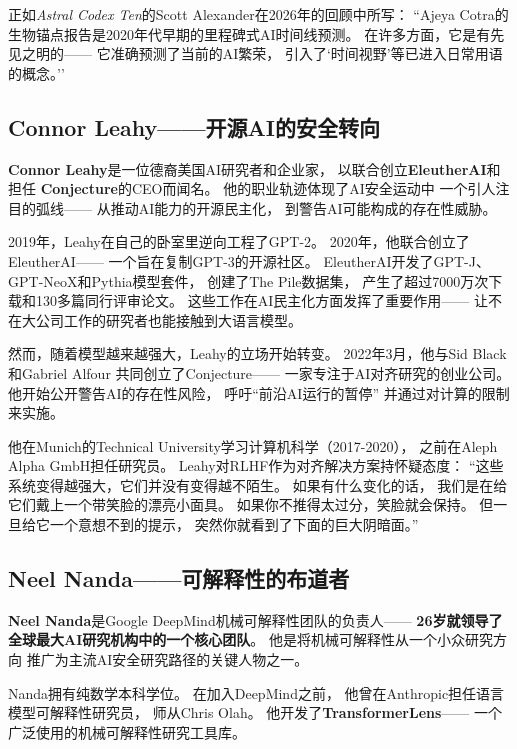 正如\textit{Astral Codex Ten}的Scott Alexander在2026年的回顾中所写：
``Ajeya Cotra的生物锚点报告是2020年代早期的里程碑式AI时间线预测。
在许多方面，它是有先见之明的——
它准确预测了当前的AI繁荣，
引入了`时间视野'等已进入日常用语的概念。''

\subsection{Connor Leahy——开源AI的安全转向}
\label{subsec:leahy}

\textbf{Connor Leahy}是一位德裔美国AI研究者和企业家，
以联合创立\textbf{EleutherAI}和担任
\textbf{Conjecture}的CEO而闻名。
他的职业轨迹体现了AI安全运动中
一个引人注目的弧线——
从推动AI能力的开源民主化，
到警告AI可能构成的存在性威胁。

2019年，Leahy在自己的卧室里逆向工程了GPT-2。
2020年，他联合创立了EleutherAI——
一个旨在复制GPT-3的开源社区。
EleutherAI开发了GPT-J、GPT-NeoX和Pythia模型套件，
创建了The Pile数据集，
产生了超过7000万次下载和130多篇同行评审论文。
这些工作在AI民主化方面发挥了重要作用——
让不在大公司工作的研究者也能接触到大语言模型。

然而，随着模型越来越强大，Leahy的立场开始转变。
2022年3月，他与Sid Black和Gabriel Alfour
共同创立了Conjecture——
一家专注于AI对齐研究的创业公司。
他开始公开警告AI的存在性风险，
呼吁``前沿AI运行的暂停''
并通过对计算的限制来实施。

他在Munich的Technical University学习计算机科学（2017-2020），
之前在Aleph Alpha GmbH担任研究员。
Leahy对RLHF作为对齐解决方案持怀疑态度：
``这些系统变得越强大，它们并没有变得越不陌生。
如果有什么变化的话，
我们是在给它们戴上一个带笑脸的漂亮小面具。
如果你不推得太过分，笑脸就会保持。
但一旦给它一个意想不到的提示，
突然你就看到了下面的巨大阴暗面。''

\subsection{Neel Nanda——可解释性的布道者}
\label{subsec:nanda}

\textbf{Neel Nanda}是Google DeepMind机械可解释性团队的负责人——
\textbf{26岁就领导了全球最大AI研究机构中的一个核心团队}。
他是将机械可解释性从一个小众研究方向
推广为主流AI安全研究路径的关键人物之一。

Nanda拥有纯数学本科学位。
在加入DeepMind之前，
他曾在Anthropic担任语言模型可解释性研究员，
师从Chris Olah。
他开发了\textbf{TransformerLens}——
一个广泛使用的机械可解释性研究工具库。

